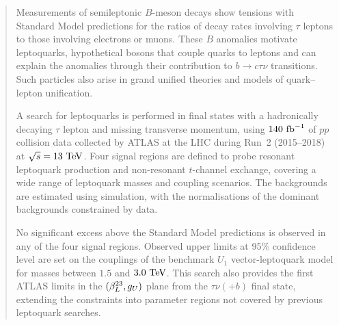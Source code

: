 \begin{abstract}

Measurements of semileptonic $B$-meson decays show tensions with Standard Model predictions for the ratios of decay rates involving $\tau$ leptons to those involving electrons or muons.
These $B$ anomalies motivate leptoquarks, hypothetical bosons that couple quarks to leptons and can explain the anomalies through their contribution to $b\to c\tau\nu$ transitions.
Such particles also arise in grand unified theories and models of quark--lepton unification.

A search for leptoquarks is performed in final states with a hadronically decaying $\tau$ lepton and missing transverse momentum, using $140~\ifb$ of $pp$ collision data collected by ATLAS at the LHC during Run~2 (2015--2018) at $\sqrt{s}=13~\TeV$.
Four signal regions are defined to probe resonant leptoquark production and non-resonant $t$-channel exchange, covering a wide range of leptoquark masses and coupling scenarios.
The backgrounds are estimated using simulation, with the normalisations of the dominant backgrounds constrained by data.

No significant excess above the Standard Model predictions is observed in any of the four signal regions.
Observed upper limits at 95\% confidence level are set on the couplings of the benchmark $U_1$ vector-leptoquark model for masses between $1.5$ and $3.0~\TeV$.
This search also provides the first ATLAS limits in the $(\beta_L^{23},\gU)$ plane from the $\tau\nu(+b)$ final state, extending the constraints into parameter regions not covered by previous leptoquark searches.

\end{abstract}

